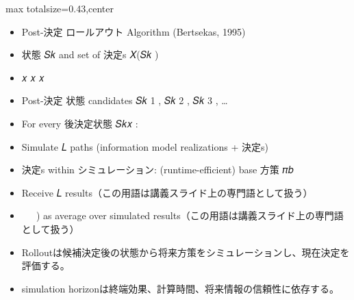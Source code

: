 \clearpage
{}
\begin{minipage}[t]{0.405\textwidth}
\begin{adjustbox}{max totalsize={\textwidth}{0.43\textheight},center}
\begin{minipage}{\textwidth}\scriptsize
{}\begin{itemize}
\item Post-決定 ロールアウト Algorithm (Bertsekas, 1995)
\item 状態 𝑆𝑘 and set of 決定s 𝑋(𝑆𝑘 )
\item 𝑥 𝑥 𝑥
\item Post-決定 状態 candidates 𝑆𝑘 1 , 𝑆𝑘 2 , 𝑆𝑘 3 , …
\item For every 後決定状態 𝑆𝑘𝑥 :
\item Simulate 𝐿 paths (information model realizations + 決定s)
\item 決定s within シミュレーション: (runtime-efficient) base 方策 𝜋𝑏
\item Receive 𝐿 results（この用語は講義スライド上の専門語として扱う）
\item ෠ 𝑘𝑥 ) as average over simulated results（この用語は講義スライド上の専門語として扱う）
\end{itemize}\begin{itemize}
\item Rolloutは候補決定後の状態から将来方策をシミュレーションし、現在決定を評価する。
\item simulation horizonは終端効果、計算時間、将来情報の信頼性に依存する。
\end{itemize}
\end{minipage}
\end{adjustbox}
\end{minipage}\hfill

